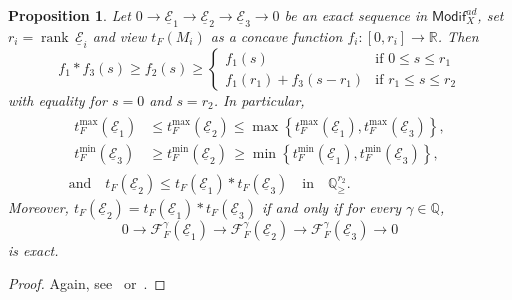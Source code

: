\documentclass[11pt]{article}
\newtheorem{prop}[theo]{Proposition}
\theoremstyle{definition}
\numberwithin{equation}{section}
\numberwithin{figure}{section}
\numberwithin{table}{section}
\newcommand{\Modif}{\mathsf{Modif}}
\DeclareMathOperator{\rank}{rank}
\begin{document}
\begin{prop}\label{prop:OnAdmModif_FarguesExactness}
Let $0\rightarrow\underline{\mathcal{E}}_{1}\rightarrow\underline{\mathcal{E}}_{2}\rightarrow\underline{\mathcal{E}}_{3}\rightarrow0$ be an exact sequence in $\Modif_{X}^{ad}$, set $r_{i}=\rank\,\underline{\mathcal{E}}_{i}$ and view $t_{F}(M_{i})$ as a concave function $f_{i}:[0,r_{i}]\rightarrow\mathbb{R}$. Then
\[
f_{1}\ast f_{3}(s)\geq f_{2}(s)\geq
\begin{cases}
f_{1}(s) & \text{if }0\leq s\leq r_{1}\\
f_{1}(r_{1})+f_{3}(s-r_{1}) & \text{if }r_{1}\leq s\leq r_{2}
\end{cases}
\]
with equality for $s=0$ and $s=r_{2}$. In particular,
\begin{gather*}
\begin{aligned}
t_{F}^{\max}(\underline{\mathcal{E}}_{1}) & \leq t_{F}^{\max}(\underline{\mathcal{E}}_{2}) \leq \max\left\{ t_{F}^{\max}(\underline{\mathcal{E}}_{1}),t_{F}^{\max}(\underline{\mathcal{E}}_{3})\right\},\\
t_{F}^{\min}(\underline{\mathcal{E}}_{3}) & \geq t_{F}^{\min}(\underline{\mathcal{E}}_{2}) \, \geq \min\left\{ t_{F}^{\min}(\underline{\mathcal{E}}_{1}),t_{F}^{\min}(\underline{\mathcal{E}}_{3})\right\},
\end{aligned}
\\
\text{and}\quad t_{F}(\underline{\mathcal{E}}_{2})\leq t_{F}(\underline{\mathcal{E}}_{1})\ast t_{F}(\underline{\mathcal{E}}_{3})\quad\text{in}\quad\mathbb{Q}_{\geq}^{r_{2}}.
\end{gather*}
Moreover, $t_{F}(\underline{\mathcal{E}}_{2})=t_{F}(\underline{\mathcal{E}}_{1})\ast t_{F}(\underline{\mathcal{E}}_{3})$ if and only if for every $\gamma\in\mathbb{Q}$,
\[
0\rightarrow\mathcal{F}_{F}^{\gamma}(\underline{\mathcal{E}}_{1})\rightarrow\mathcal{F}_{F}^{\gamma}(\underline{\mathcal{E}}_{2})\rightarrow\mathcal{F}_{F}^{\gamma}(\underline{\mathcal{E}}_{3})\rightarrow0
\]
is exact.
\end{prop}

\begin{proof}
Again, see~\cite[Proposition~21]{Co16} or~\cite[4.4.4]{An09}.
\end{proof}
\end{document}
